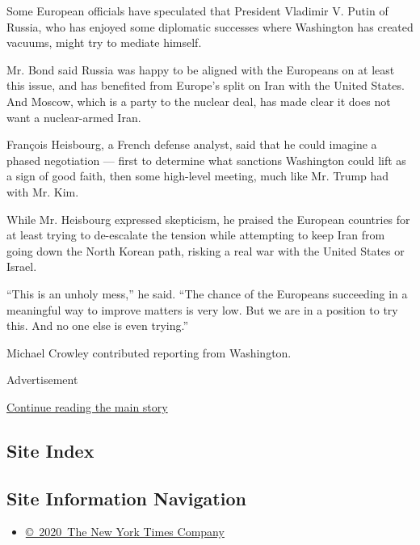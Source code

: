 Some European officials have speculated that President Vladimir V. Putin
of Russia, who has enjoyed some diplomatic successes where Washington
has created vacuums, might try to mediate himself.

Mr. Bond said Russia was happy to be aligned with the Europeans on at
least this issue, and has benefited from Europe's split on Iran with the
United States. And Moscow, which is a party to the nuclear deal, has
made clear it does not want a nuclear-armed Iran.

François Heisbourg, a French defense analyst, said that he could imagine
a phased negotiation --- first to determine what sanctions Washington
could lift as a sign of good faith, then some high-level meeting, much
like Mr. Trump had with Mr. Kim.

While Mr. Heisbourg expressed skepticism, he praised the European
countries for at least trying to de-escalate the tension while
attempting to keep Iran from going down the North Korean path, risking a
real war with the United States or Israel.

``This is an unholy mess,'' he said. ``The chance of the Europeans
succeeding in a meaningful way to improve matters is very low. But we
are in a position to try this. And no one else is even trying.''

Michael Crowley contributed reporting from Washington.

Advertisement

\protect\hyperlink{after-bottom}{Continue reading the main story}

\hypertarget{site-index}{%
\subsection{Site Index}\label{site-index}}

\hypertarget{site-information-navigation}{%
\subsection{Site Information
Navigation}\label{site-information-navigation}}

\begin{itemize}
\tightlist
\item
  \href{https://help.nytimes.com/hc/en-us/articles/115014792127-Copyright-notice}{©~2020~The
  New York Times Company}
\end{itemize}


